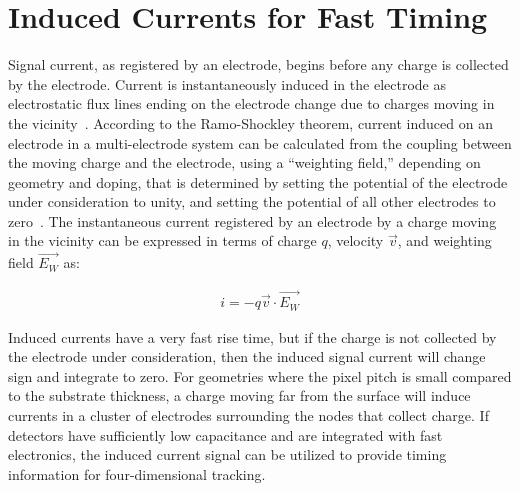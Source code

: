 \section{Induced Currents for Fast Timing}
Signal current, as registered by an electrode, begins before any charge is collected by the electrode.  
Current is instantaneously induced in the electrode as electrostatic flux lines ending on the electrode change due to charges moving in the vicinity~\cite{doi:10.1063/1.1710367}.
According to the Ramo-Shockley theorem, current induced on an electrode in a multi-electrode system can be calculated from the coupling between the moving charge and the electrode, using a ``weighting field,'' depending on geometry and doping, that is determined by setting the potential of the electrode under consideration to unity, and setting the potential of all other electrodes to zero~\cite{1686997}.
The instantaneous current registered by an electrode by a charge moving in the vicinity can be expressed in terms of charge $q$, velocity $\vec{v}$, and weighting field $\vec{E_W}$ as:
\begin{linenomath*}
\begin{align}
i = -q \vec{v} \cdot \vec{E_W}
\end{align}
\end{linenomath*}
Induced currents have a very fast rise time, but if the charge is not collected by the electrode under consideration, then the induced signal current will change sign and integrate to zero.
For geometries where the pixel pitch is small compared to the substrate thickness, a charge moving far from the surface will induce currents in a cluster of electrodes surrounding the nodes that collect charge.
If detectors have sufficiently low capacitance and are integrated with fast electronics, the induced current signal can be utilized to provide timing information for four-dimensional tracking.

